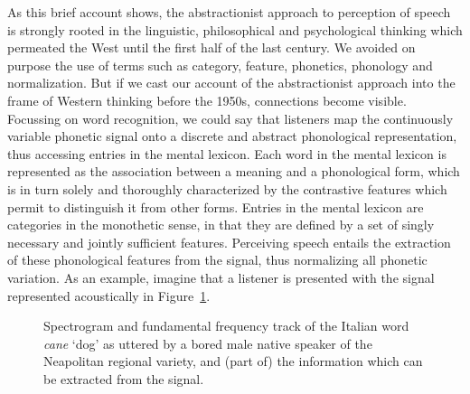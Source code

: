 As this brief account shows, the abstractionist approach to perception of speech is strongly rooted in the linguistic, philosophical and psychological thinking which permeated the West until the first half of the last century. We avoided on purpose the use of terms such as category, feature, phonetics, phonology and normalization. But if we cast our account of the abstractionist approach into the frame of Western thinking before the 1950s, connections become visible. Focussing on word recognition, we could say that listeners map the continuously variable phonetic signal onto a discrete and abstract phonological representation, thus accessing entries in the mental lexicon. Each word in the mental lexicon is represented as the association between a meaning and a phonological form, which is in turn solely and thoroughly characterized by the contrastive features which permit to distinguish it from other forms. Entries in the mental lexicon are categories in the monothetic sense, in that they are defined by a set of singly necessary and jointly sufficient features. Perceiving speech entails the extraction of these phonological features from the signal, thus normalizing all phonetic variation. As an example, imagine that a listener is presented with the signal represented acoustically in Figure~\ref{fig101}. 

\begin{figure}
\centering
{}
\caption{Spectrogram and fundamental frequency track of the Italian word \textit{cane} `dog' as uttered by a bored male native speaker of the Neapolitan regional variety, and (part of) the information which can be extracted from the signal.}
\label{fig101}\end{figure}

